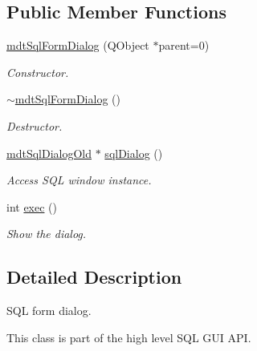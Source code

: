 \subsection*{Public Member Functions}
\begin{DoxyCompactItemize}
\item 
\hypertarget{classmdt_sql_form_dialog_af60a25c2654f0af7c62df42854af4bb1}{
\hyperlink{classmdt_sql_form_dialog_af60a25c2654f0af7c62df42854af4bb1}{mdtSqlFormDialog} (QObject $\ast$parent=0)}
\label{classmdt_sql_form_dialog_af60a25c2654f0af7c62df42854af4bb1}

\begin{DoxyCompactList}\small\item\em Constructor. \end{DoxyCompactList}\item 
\hypertarget{classmdt_sql_form_dialog_ac75cd78f6fc2ccac75a6d6fab6922a5e}{
\hyperlink{classmdt_sql_form_dialog_ac75cd78f6fc2ccac75a6d6fab6922a5e}{$\sim$mdtSqlFormDialog} ()}
\label{classmdt_sql_form_dialog_ac75cd78f6fc2ccac75a6d6fab6922a5e}

\begin{DoxyCompactList}\small\item\em Destructor. \end{DoxyCompactList}\item 
\hyperlink{classmdt_sql_dialog_old}{mdtSqlDialogOld} $\ast$ \hyperlink{classmdt_sql_form_dialog_a9496867a9d00cf436055cf358c78dfbb}{sqlDialog} ()
\begin{DoxyCompactList}\small\item\em Access SQL window instance. \end{DoxyCompactList}\item 
\hypertarget{classmdt_sql_form_dialog_abc0e9db0da2b1e27d7f5853ecc465c1a}{
int \hyperlink{classmdt_sql_form_dialog_abc0e9db0da2b1e27d7f5853ecc465c1a}{exec} ()}
\label{classmdt_sql_form_dialog_abc0e9db0da2b1e27d7f5853ecc465c1a}

\begin{DoxyCompactList}\small\item\em Show the dialog. \end{DoxyCompactList}\end{DoxyCompactItemize}


\subsection{Detailed Description}
SQL form dialog. 

This class is part of the high level SQL GUI API.

